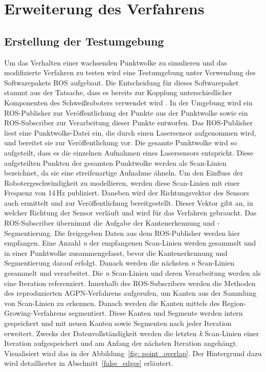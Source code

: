 
\section{Erweiterung des Verfahrens}
\subsection{Erstellung der Testumgebung} \label{Testumgebung}
Um das Verhalten einer wachsenden Punktwolke zu simulieren und das modifizierte Verfahren zu testen wird eine Testumgebung unter Verwendung des Softwarepakets ROS aufgebaut. Die Entscheidung für dieses Softwarepaket stammt aus der Tatsache, dass es bereits zur Kopplung unterschiedlicher Komponenten des Schweißroboters verwendet wird \autocite[39]{savla_intelligente_2022}. In der Umgebung wird ein ROS-Publisher zur Veröffentlichung der Punkte aus der Punktwolke sowie ein ROS-Subscriber zur Verarbeitung dieser Punkte entworfen. Das ROS-Publisher liest eine Punktwolke-Datei ein, die durch einen Lasersensor aufgenommen wird, und bereitet sie zur Veröffentlichung vor. Die gesamte Punktwolke wird so aufgeteilt, dass es die einzelnen Aufnahmen eines Lasersensors entspricht. Diese aufgeteilten Punkten der gesamten Punktwolke werden als Scan-Linien bezeichnet, da sie eine streifenartige Aufnahme ähneln. Um den Einfluss der Robotergeschwindigkeit zu modellieren, werden diese Scan-Linien mit einer Frequenz von 14\,Hz publiziert. Daneben wird der Richtungsvektor des Sensors auch ermittelt und zur Veröffentlichung bereitgestellt. Dieser Vektor gibt an, in welcher Richtung der Sensor verläuft und wird für das Verfahren gebraucht. Das ROS-Subscriber übernimmt die Aufgabe der Kantenerkennung und -Segmentierung. Die freigegeben Daten aus dem ROS-Publisher werden hier empfangen. Eine Anzahl \textit{n} der empfangenen Scan-Linien werden gesammelt und in einer Punktwolke zusammengefasst, bevor die Kantenerkennung und Segmentierung darauf erfolgt. Danach werden die nächsten \textit{n} Scan-Linien gesammelt und verarbeitet. Die \textit{n} Scan-Linien und deren Verarbeitung werden als eine Iteration referenziert. Innerhalb des ROS-Subscribers werden die Methoden des reproduzierten AGPN-Verfahrens aufgerufen, um Kanten aus der Sammlung von Scan-Linien zu erkennen. Danach werden die Kanten mittels des Region-Growing-Verfahrens segmentiert. Diese Kanten und Segmente werden intern gespeichert und mit neuen Kanten sowie Segmenten nach jeder Iteration erweitert. Zwecks der Datenvollständigkeit werden die letzten \textit{k} Scan-Linien einer Iteration aufgespeichert und am Anfang der nächsten Iteration angehängt. Visualisiert wird das in der Abbildung~\ref{fig: point_overlap}. Der Hintergrund dazu wird detaillierter in Abschnitt~\ref{false_edges} erläutert.

